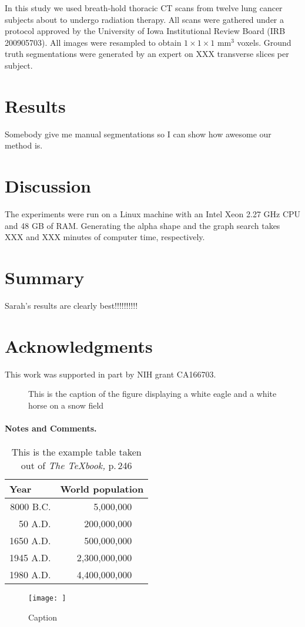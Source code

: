 \documentclass{llncs}
\begin{document}
In this study we used breath-hold thoracic CT scans from twelve lung cancer subjects
about to undergo radiation therapy. All scans were gathered under a protocol approved by the University of Iowa Institutional Review Board (IRB 200905703). All images were resampled to obtain $1\times{}1\times{}1$ mm$^3$ voxels. Ground truth segmentations were generated by an expert on XXX transverse slices per subject.
%
\section{Results}
%
Somebody give me manual segmentations so I can show how awesome our method is.
%
\section{Discussion}
%
The experiments were run on a Linux machine with an Intel Xeon 2.27 GHz CPU and 48 GB of RAM. Generating the alpha shape and the graph search takes XXX and XXX minutes of computer time, respectively. 
%
\section{Summary}
%
Sarah's results are clearly best!!!!!!!!!!
%
\section{Acknowledgments}
%
This work was supported in part by NIH grant CA166703.



\iffalse

\begin{figure}
\vspace{2.5cm}
\caption{This is the caption of the figure displaying a white eagle and
a white horse on a snow field}
\end{figure}


%
\paragraph{Notes and Comments.}


\begin{table}
\caption{This is the example table taken out of {\it The
\TeX{}book,} p.\,246}
\begin{center}
\begin{tabular}{r@{\quad}rl}
\hline
\multicolumn{1}{l}{\rule{0pt}{12pt}
                   Year}&\multicolumn{2}{l}{World population}\\[2pt]
\hline\rule{0pt}{12pt}
8000 B.C.  &     5,000,000& \\
  50 A.D.  &   200,000,000& \\
1650 A.D.  &   500,000,000& \\
1945 A.D.  & 2,300,000,000& \\
1980 A.D.  & 4,400,000,000& \\[2pt]
\hline
\end{tabular}
\end{center}
\end{table}
\begin{figure}
    \centering
    \texttt{[image: ]}
    \caption{Caption}
    \label{fig:my_label}
\end{figure}
\end{document}
